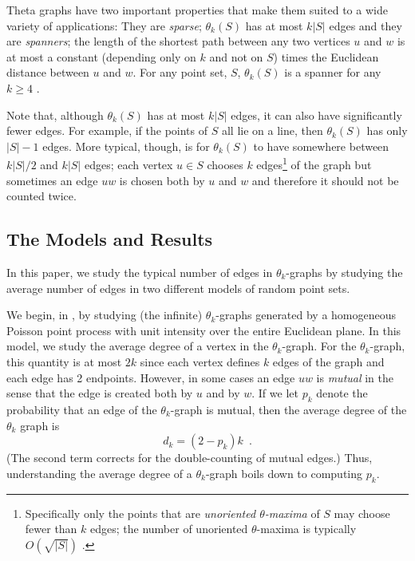 \documentclass[twoside,leqno,twocolumn]{article}
\begin{document}
Theta graphs have two important properties that make them suited to a
wide variety of applications:  They are \emph{sparse}; $\theta_k(S)$
has at most $k|S|$ edges and they are \emph{spanners}; the length
of the shortest path between any two vertices $u$ and $w$ is at most
a constant (depending only on $k$ and not on $S$) times the Euclidean
distance between $u$ and $w$.  For any point set, $S$, $\theta_k(S)$ is
a spanner for any $k\ge 4$
\cite{barba.bose.ea:on,bonichon.gavoille.ea:connections,%
bose.morin.ea:theta-5,keil:approximating,ruppert.seidel:approximating}.

Note that, although $\theta_k(S)$ has at most $k|S|$ edges, it can also
have significantly fewer edges.  For example, if the points of $S$ all
lie on a line, then $\theta_k(S)$ has only $|S|-1$ edges.  More typical,
though, is for $\theta_k(S)$ to have somewhere between $k|S|/2$ and $k|S|$
edges;  each vertex $u\in S$ chooses $k$ edges\footnote{Specifically only
the points that are \emph{unoriented $\theta$-maxima} of $S$ may choose
fewer than $k$ edges; the number of unoriented $\theta$-maxima is typically
$O(\sqrt{|S|})$ \cite[Theorem~4]{avis.beresford-smith.ea:unoriented}.}
of the graph but sometimes an edge $uw$ is chosen both by $u$ and $w$
and therefore it should not be counted twice.

\subsection{The Models and Results}

In this paper, we study the typical number of edges in $\theta_k$-graphs
by studying the average number of edges in two different models of random
point sets.

We begin, in , by studying (the infinite)
$\theta_k$-graphs generated by a homogeneous Poisson point process
with unit intensity over the entire Euclidean plane.  In this model,
we study the average degree of a vertex in the $\theta_k$-graph.
For the $\theta_k$-graph, this quantity is at most $2k$ since each
vertex defines $k$ edges of the graph and each edge has 2 endpoints.
However, in some cases an edge $uw$ is \emph{mutual} in the sense that
the edge is created both by $u$ and by $w$.  If we let $p_k$ denote the
probability that an edge of the $\theta_k$-graph is mutual, then the
average degree of the $\theta_k$ graph is
\[
    d_k = (2-p_k)k \enspace .
\]
(The second term corrects for the double-counting of mutual edges.)  Thus,
understanding the average degree of a $\theta_k$-graph boils down to
computing $p_k$.
\end{document}
